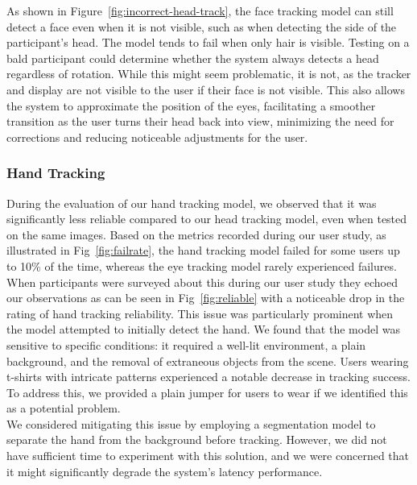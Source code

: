As shown in Figure~\ref{fig:incorrect-head-track}, the face tracking model can still detect a face even when it is not visible, such as when detecting the side of the participant's head. The model tends to fail when only hair is visible. Testing on a bald participant could determine whether the system always detects a head regardless of rotation. While this might seem problematic, it is not, as the tracker and display are not visible to the user if their face is not visible. This also allows the system to approximate the position of the eyes, facilitating a smoother transition as the user turns their head back into view, minimizing the need for corrections and reducing noticeable adjustments for the user.

\subsubsection{Hand Tracking}

During the evaluation of our hand tracking model, we observed that it was significantly less reliable compared to our head tracking model, even when tested on the same images. Based on the metrics recorded during our user study, as illustrated in Fig~\ref{fig:failrate}, the hand tracking model failed for some users up to 10\% of the time, whereas the eye tracking model rarely experienced failures. When participants were surveyed about this during our user study they echoed our observations as can be seen in Fig~\ref{fig:reliable} with a noticeable drop in the rating of hand tracking reliability. This issue was particularly prominent when the model attempted to initially detect the hand. We found that the model was sensitive to specific conditions: it required a well-lit environment, a plain background, and the removal of extraneous objects from the scene. Users wearing t-shirts with intricate patterns experienced a notable decrease in tracking success. To address this, we provided a plain jumper for users to wear if we identified this as a potential problem. \\

We considered mitigating this issue by employing a segmentation model to separate the hand from the background before tracking. However, we did not have sufficient time to experiment with this solution, and we were concerned that it might significantly degrade the system's latency performance.

